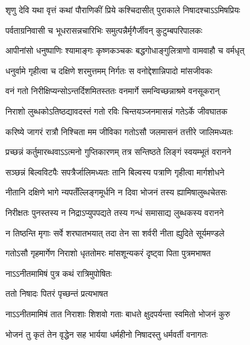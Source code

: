 
\twolineshloka
{शृणु देवि यथा वृत्तं कथां पौराणिकीं प्रिये}
{कश्चिदासीत् पुराकाले निषादश्चाऽऽमिषप्रियः} %

\twolineshloka
{पर्वताग्रनिवासी च भूधरासन्नचारिभिः}
{समुत्पन्नैर्मृगैर्जीवन् कुटुम्बपरिपालकः} %

\twolineshloka
{आपीनांसो धनुष्पाणिः श्यामाङ्गः कृष्णकञ्चकः}
{बद्धगोधाङ्गुलित्राणो वामवाहौ च वर्मधृत्} %

\twolineshloka
{धनुर्वामे गृहीत्वा च दक्षिणे शरमुत्तमम्}
{निर्गतः स वनोद्देशान्निपादो मांसजीवकः} %

\twolineshloka
{वनं गतो निरीक्षिप्यन्सोऽन्तर्दिशमितस्ततः}
{वनमार्गे समन्विच्छन्नाश्रमे वनसूकरान्} %

\twolineshloka
{निराशो लुब्धकोऽतिष्ठद्यावदस्तं गतो रविः}
{चिन्तयञ्जनमासन्नं गतेऽर्के जीवघातक} %

\twolineshloka
{करिष्ये जागरं रात्रौ निश्चिता मम जीविका}
{गतोऽसौ जलमासनं तत्तीरे जालिमध्यतः} %

\twolineshloka
{प्रच्छन्नं कर्तुमारब्धवाऽऽत्मनो गुप्तिकारणम्}
{तत्र सन्तिष्ठते लिङ्गं स्वयम्भूतं वरानने} %

\twolineshloka
{सञ्छन्नं बिल्वविटपैः सपत्रैर्जालिमध्यतः}
{तानि बिल्वस्य पत्राणि गृहीत्वा मार्गशोधने} %

\twolineshloka
{नीतानि दक्षिणे भागे न्यपतँल्लिङ्गमूर्धनि}
{न दिवा भोजनं तस्य ह्यामिषालुब्धचेतसः} %

\twolineshloka
{निरीक्षतः पुनस्तस्य न निद्राऽप्युपपद्यते}
{तस्य गन्धं समासाद्य लुब्धकस्य वरानने} %

\twolineshloka
{न तिष्ठन्ति मृगाः सर्वे शरघातभयात् तदा}
{तेन सा शर्वरी नीता ह्युदिते सूर्यमण्डले} %

\twolineshloka
{गतोऽसौ गृहमार्गेण निराशो धृततोमरः}
{मांसशून्यकरं दृष्ट्वा पिता पुत्रमभाषत} %


\onelineshloka
{नाऽऽनीतमामिषं पुत्र कथं रात्रिमुपोषितः} %


\onelineshloka
{ततो निषादः पितरं पृच्छन्तं प्रत्यभाषत} %


\twolineshloka
{नाऽऽनीतमामिषं तात निराशाः शिशवो गताः}
{बाधते क्षुदपर्यन्ता स्वमितो भोजनं कुरु} %



\twolineshloka
{भोजनं तु कृतं तेन वृद्धेन सह भार्यया}
{धर्महीनो निषादस्तु धर्मवर्ती वनागतः} %


